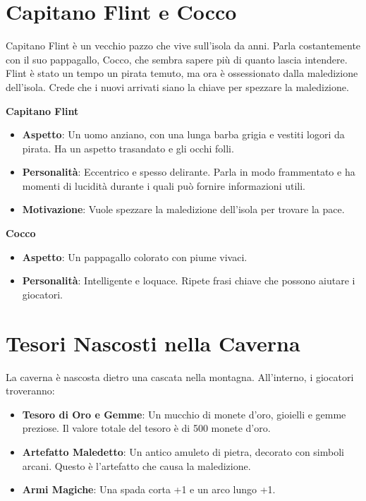 \documentclass{article}
\begin{document}
\section*{Capitano Flint e Cocco}

Capitano Flint è un vecchio pazzo che vive sull'isola da anni. Parla costantemente con il suo pappagallo, Cocco, che sembra sapere più di quanto lascia intendere. Flint è stato un tempo un pirata temuto, ma ora è ossessionato dalla maledizione dell'isola. Crede che i nuovi arrivati siano la chiave per spezzare la maledizione.

\textbf{Capitano Flint}
\begin{itemize}
    \item \textbf{Aspetto}: Un uomo anziano, con una lunga barba grigia e vestiti logori da pirata. Ha un aspetto trasandato e gli occhi folli.
    \item \textbf{Personalità}: Eccentrico e spesso delirante. Parla in modo frammentato e ha momenti di lucidità durante i quali può fornire informazioni utili.
    \item \textbf{Motivazione}: Vuole spezzare la maledizione dell'isola per trovare la pace.
\end{itemize}

\textbf{Cocco}
\begin{itemize}
    \item \textbf{Aspetto}: Un pappagallo colorato con piume vivaci.
    \item \textbf{Personalità}: Intelligente e loquace. Ripete frasi chiave che possono aiutare i giocatori.
\end{itemize}

\section*{Tesori Nascosti nella Caverna}

La caverna è nascosta dietro una cascata nella montagna. All'interno, i giocatori troveranno:

\begin{itemize}
    \item \textbf{Tesoro di Oro e Gemme}: Un mucchio di monete d'oro, gioielli e gemme preziose. Il valore totale del tesoro è di 500 monete d'oro.
    \item \textbf{Artefatto Maledetto}: Un antico amuleto di pietra, decorato con simboli arcani. Questo è l'artefatto che causa la maledizione.
    \item \textbf{Armi Magiche}: Una spada corta +1 e un arco lungo +1.
\end{itemize}
\end{document}
